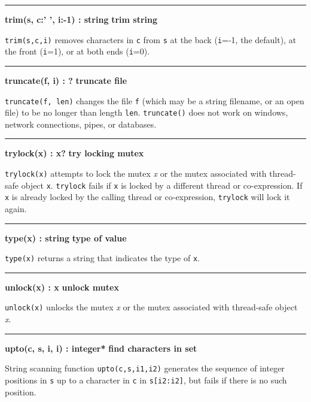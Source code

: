 \bigskip\hrule\vspace{0.1cm}
\noindent
{\bf trim(s, c:' ', i:{}-1) : string } \hfill {\bf trim string}

\noindent
{}\texttt{trim(s,c,i)} removes characters in \texttt{c}
from \texttt{s} at the back (\texttt{i}=-1, the default), at the front
(\texttt{i}=1), or at both ends (\texttt{i}=0).

\bigskip\hrule\vspace{0.1cm}
\noindent
{\bf truncate(f, i) : ? } \hfill {\bf truncate file}

\noindent
{}\texttt{truncate(f, len)} changes the file
\texttt{f} (which may be a string filename, or an open file) to be no
longer than length \texttt{len}. \texttt{truncate()} does not work on
windows, network connections, pipes, or databases.

\bigskip\hrule\vspace{0.1cm}
\noindent
{\bf trylock(x) : x? } \hfill {\bf try locking mutex}

\noindent
{}\texttt{trylock(x)} attempts to lock the mutex {\textit x} or the
mutex associated with thread-safe object \texttt{x}. \texttt{trylock} fails
if \texttt{x} is locked by a different thread or co-expression. If \texttt{x}
is already locked by the calling thread or co-expression, \texttt{trylock}
will lock it again.

\bigskip\hrule\vspace{0.1cm}
\noindent
{\bf type(x) : string } \hfill {\bf type of value}

\noindent
{}\texttt{type(x)} returns a string that indicates the type
of \texttt{x}.

\bigskip\hrule\vspace{0.1cm}
\noindent
{\bf unlock(x) : x } \hfill {\bf unlock mutex}

\noindent
{}\texttt{unlock(x)} unlocks the mutex {\textit x} or the mutex
associated with thread-safe object {\textit x}.

\bigskip\hrule\vspace{0.1cm}
\noindent
{\bf upto(c, s, i, i) : integer* } \hfill {\bf find characters in set}

\noindent
String scanning function \texttt{upto(c,s,i1,i2)}
generates the sequence of integer positions in \texttt{s} up to a
character in \texttt{c} in \texttt{s[i2:i2]}, but fails if there is no
such position.

